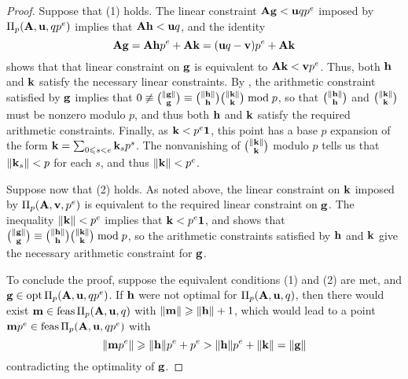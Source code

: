 \documentclass{amsart}
\begin{document}
\begin{proof}
   Suppose that (1) holds.
   The linear constraint $\mathbf{A}\mathbf{g} < \mathbf{u}qp^e$ imposed by $\Pi_p(\mathbf{A}, \mathbf{u}, qp^e)$ implies that $\mathbf{A}\mathbf{h} < \mathbf{u}q$, and the identity
   \[\mathbf{A} \mathbf{g} = \mathbf{A} \mathbf{h} p^e + \mathbf{A} \mathbf{k} = (\mathbf{u}q-\mathbf{v})p^e + \mathbf{A} \mathbf{k}\]
   shows that that linear constraint on $\mathbf{g}$ is equivalent to $\mathbf{A} \mathbf{k} < \mathbf{v}p^e$.
   Thus, both $\mathbf{h}$ and $\mathbf{k}$ satisfy the necessary linear constraints.
   By , the arithmetic constraint satisfied by $\mathbf{g}$ implies that $0 \not \equiv \binom{\| \mathbf{g} \|}{\mathbf{g}} \equiv \binom{\| \mathbf{h} \|}{\mathbf{h}} \binom{\| \mathbf{k} \|}{\mathbf{k}} \bmod p$, so that $\binom{\| \mathbf{h} \|}{\mathbf{h}}$ and $\binom{\| \mathbf{k} \|}{\mathbf{k}}$ must be nonzero modulo $p$, and thus both $\mathbf{h}$ and $\mathbf{k}$ satisfy the required arithmetic constraints.
   Finally, as $\mathbf{k} < p^e\mathbf{1}$, this point has a base $p$ expansion of the form $\mathbf{k} = \sum_{0 \leqslant s< e} \mathbf{k}_s  p^s$.
   The nonvanishing of $\binom{\| \mathbf{k} \|}{\mathbf{k}}$ modulo $p$ tells us that $\| \mathbf{k}_s \| < p$ for each $s$, and thus $\| \mathbf{k} \| < p^e$.
   
   Suppose now that (2) holds.
   As noted above, the linear constraint on $\mathbf{k}$ imposed by $\Pi_p(\mathbf{A},\mathbf{v},p^e)$ is equivalent to the required linear constraint on $\mathbf{g}$.
   The inequality $\| \mathbf{k} \| < p^e$ implies that $\mathbf{k} < p^e \mathbf{1}$, and  shows that $\binom{\| \mathbf{g} \|}{\mathbf{g}} \equiv  \binom{\| \mathbf{h} \|}{\mathbf{h}} \binom{\| \mathbf{k} \|}{\mathbf{k}} \bmod p$, so the arithmetic constraints satisfied by $\mathbf{h}$ and $\mathbf{k}$ give the necessary arithmetic constraint for $\mathbf{g}$.

   To conclude the proof, suppose the equivalent conditions (1) and (2) are met, and $\mathbf{g} \in \operatorname{opt} \Pi_p(\mathbf{A},\mathbf{u},qp^e)$.
   If $\mathbf{h}$ were not optimal for $\Pi_p(\mathbf{A}, \mathbf{u}, q)$, then there would exist $\mathbf{m} \in \operatorname{feas}\Pi_p(\mathbf{A}, \mathbf{u}, q)$ with $\| \mathbf{m} \| \geqslant \| \mathbf{h} \| + 1$, which would lead to a point $\mathbf{m}p^e \in \operatorname{feas}\Pi_p(\mathbf{A}, \mathbf{u}, qp^e)$ with
   \[ \| \mathbf{m}p^e \| \geqslant \| \mathbf{h} \|  p^e + p^e >  \| \mathbf{h} \|  p^e + \| \mathbf{k} \| = \| \mathbf{g} \|\]
   contradicting the optimality of $\mathbf{g}$.
\end{proof}
\end{document}
